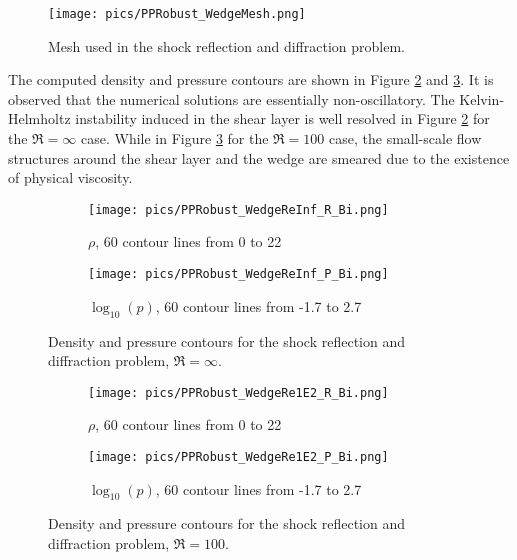 \begin{figure}[htbp]
    \centering
    \texttt{[image: pics/PPRobust\_WedgeMesh.png]}
    \caption{Mesh used in the shock reflection and diffraction problem.}
    \label{fig:wedgeMesh}
\end{figure}

The computed density and pressure contours are shown in Figure \ref{fig:wedgeReInf} and \ref{fig:wedgeRe1E2}.
It is observed that the numerical solutions are essentially non-oscillatory.
The Kelvin-Helmholtz instability induced in the shear layer is well resolved in Figure \ref{fig:wedgeReInf} for the $\Re=\infty$ case.
While in Figure  \ref{fig:wedgeRe1E2} for the $\Re=100$ case,
the small-scale flow structures around the shear layer and the wedge are smeared  due to the existence of physical viscosity.

\begin{figure}[htbp!]
    \centering
    \begin{subfigure}{0.5\textwidth}
        \texttt{[image: pics/PPRobust\_WedgeReInf\_R\_Bi.png]}
        \caption[]{$\rho$, 60 contour lines from 0 to 22}
    \end{subfigure}\hfill
    \begin{subfigure}{0.5\textwidth}
        \texttt{[image: pics/PPRobust\_WedgeReInf\_P\_Bi.png]}
        \caption[]{$\log_{10}(p)$, 60 contour lines from -1.7 to 2.7}
    \end{subfigure}
    \caption{Density and pressure contours for the shock reflection and diffraction problem, $\Re=\infty$.}
    \label{fig:wedgeReInf}
\end{figure}

\begin{figure}[htbp!]
    \centering
    \begin{subfigure}{0.5\textwidth}
        \texttt{[image: pics/PPRobust\_WedgeRe1E2\_R\_Bi.png]}
        \caption[]{$\rho$, 60 contour lines from 0 to 22}
    \end{subfigure}\hfill
    \begin{subfigure}{0.5\textwidth}
        \texttt{[image: pics/PPRobust\_WedgeRe1E2\_P\_Bi.png]}
        \caption[]{$\log_{10}(p)$, 60 contour lines from -1.7 to 2.7}
    \end{subfigure}
    \caption{Density and pressure contours for the shock reflection and diffraction problem, $\Re=100$.}
    \label{fig:wedgeRe1E2}
\end{figure}

